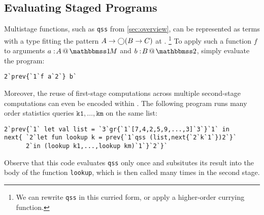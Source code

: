 \subsection{Evaluating Staged Programs}

Multistage functions, such as \texttt{qss} from \ref{sec:overview},
can be represented as terms with a type fitting the pattern \mbox{$A\to \bigcirc (B \to C)$} at \bbonem.%
\footnote{We can rewrite \texttt{qss} in this curried form, or apply a
higher-order currying function.} 
To apply such a function $f$ to arguments $\colmix a A$ and $\coltwo b B$, simply
evaluate the program:
\begin{lstlisting}
2`prev{`1`f a`2`} b`
\end{lstlisting}
Moreover, the reuse of first-stage computations across
multiple second-stage computations can even be encoded within \lang. 
The following program runs many order statistics queries
$\texttt{k1},\dots,\texttt{km}$ on the same list:
\begin{lstlisting}
2`prev{`1` let val list = `3`gr{`1`[7,4,2,5,9,...,3]`3`}`1` in 
next{ `2`let fun lookup k = prev{`1`qss (list,next{`2`k`1`})2`}`
      2`in (lookup k1,...,lookup km)`1`}`2`}`
\end{lstlisting}
Observe that this code evaluates \texttt{qss} only once
and subsitutes its result into the body of the function \texttt{lookup},
which is then called many times in the second stage.
